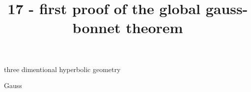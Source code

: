 \documentclass{article}
\title{17 - first proof of the global gauss-bonnet theorem}
\newenvironment{andrew_section}[1]
    {
    \section{#1}
    \begin{itemize}
    }
    {
    \end{itemize}
    }
\begin{document}
\maketitle

\begin{andrew_section}{three dimentional hyperbolic geometry}
    \item 
        Gauss
\end{andrew_section}
\end{document}
